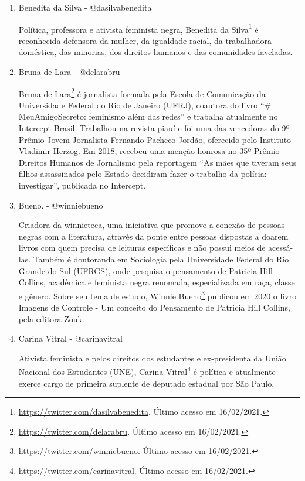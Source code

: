\documentclass[
	12pt,				%
	openright,			%
	twoside,			%
	a4paper,			%
	english,			%
	brazil				%
	]{abntex2}
\begin{document}
\begin{anexosenv}
\begin{enumerate}
 \item Benedita da Silva - @dasilvabenedita
 
 Política, professora e ativista feminista negra, Benedita da Silva\footnote{\url{https://twitter.com/dasilvabenedita}. Último acesso em 16/02/2021.} é reconhecida defensora da mulher, da igualdade racial, da trabalhadora doméstica, das minorias, dos direitos humanos e das comunidades faveladas.

 \item Bruna de Lara - @delarabru
 
 Bruna de Lara\footnote{\url{https://twitter.com/delarabru}. Último acesso em 16/02/2021.} é jornalista formada pela Escola de Comunicação da Universidade Federal do Rio de Janeiro (UFRJ), coautora do livro ``$\#$MeuAmigoSecreto: feminismo além das redes'' e trabalha atualmente no Intercept Brasil. Trabalhou na revista piauí e foi uma das vencedoras do 9º Prêmio Jovem Jornalista Fernando Pacheco Jordão, oferecido pelo Instituto Vladimir Herzog. Em 2018, recebeu uma menção honrosa no 35º Prêmio Direitos Humanos de Jornalismo pela reportagem ``As mães que tiveram seus filhos assassinados pelo Estado decidiram fazer o trabalho da polícia: investigar'', publicada no Intercept.
 
 \newpage

 \item Bueno. - @winniebueno
 
 Criadora da winnieteca, uma iniciativa que promove a conexão de pessoas negras com a literatura, através da ponte entre pessoas dispostas a doarem livros com quem precisa de leituras específicas e não possui meios de acessá-las. Também é doutoranda em Sociologia pela Universidade Federal do Rio Grande do Sul (UFRGS), onde pesquisa o pensamento de Patricia Hill Collins, acadêmica e feminista negra renomada, especializada em raça, classe e gênero. Sobre seu tema de estudo, Winnie Bueno\footnote{\url{https://twitter.com/winniebueno}. Último acesso em 16/02/2021.} publicou em 2020 o livro Imagens de Controle - Um conceito do Pensamento de Patricia Hill Collins, pela editora Zouk.

 \item Carina Vitral - @carinavitral
 
 Ativista feminista e pelos direitos dos estudantes e ex-presidenta da União Nacional dos Estudantes (UNE), Carina Vitral\footnote{\url{https://twitter.com/carinavitral}. Último acesso em 16/02/2021.} é política e atualmente exerce cargo de primeira suplente de deputado estadual por São Paulo.


\end{enumerate}
\end{anexosenv}
\end{document}
